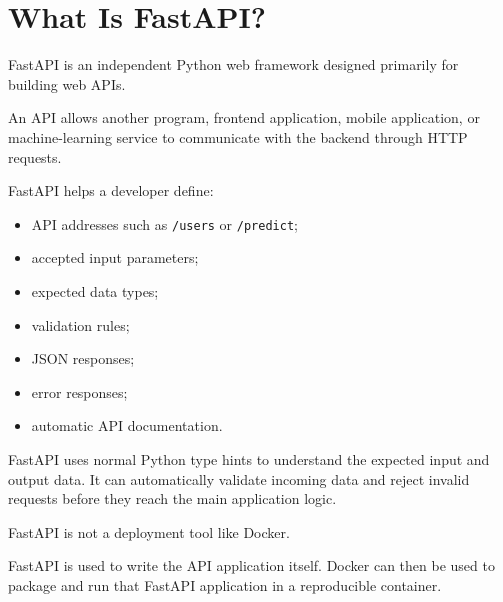 \documentclass[a4paper]{article}
\title{
    \textbf{FastAPI and Django}\[4pt]
        {\large Their Purpose, Differences, and Relationship}
}
\date{}
\author{Mohammad Rahmani}
\begin{document}
    
    \maketitle
    
    
    \section*{What Is FastAPI?}
        
        FastAPI is an independent Python web framework designed primarily for
        building web APIs.
        
        An API allows another program, frontend application, mobile application,
        or machine-learning service to communicate with the backend through
        HTTP requests.
        
        FastAPI helps a developer define:
        
        \begin{itemize}
            \item API addresses such as \texttt{/users} or \texttt{/predict};
            \item accepted input parameters;
            \item expected data types;
            \item validation rules;
            \item JSON responses;
            \item error responses;
            \item automatic API documentation.
        \end{itemize}
        
        FastAPI uses normal Python type hints to understand the expected input
        and output data. It can automatically validate incoming data and reject
        invalid requests before they reach the main application logic.
        
        \begin{tcolorbox}[
            colback=lightblue,
            colframe=headerblue,
            title=\textbf{Important},
            fonttitle=\bfseries,
            breakable
        ]
            FastAPI is not a deployment tool like Docker.
            
            FastAPI is used to write the API application itself. Docker can then be
            used to package and run that FastAPI application in a reproducible
            container.
        \end{tcolorbox}
    
\end{document}
